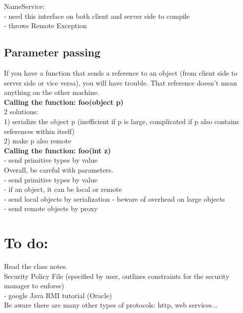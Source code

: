 \documentclass[twoside]{article}
\begin{document}
NameService: \\
 - need this interface on both client and server side to compile \\
 - throws Remote Exception \\
 
\subsection{Parameter passing} 

If you have a function that sends a reference to an object (from client side to server side or vice versa), you will have trouble.  That reference doesn't mean anything on the other machine. \\

\textbf{Calling the function:  foo(object p)} \\
2 solutions: \\
 1) serialize the object p (inefficient if p is large, complicated if p also contains references within itself) \\
 2) make p also remote \\
 
\textbf{Calling the function:  foo(int z)} \\
 - send primitive types by value \\
 
Overall, be careful with parameters. \\
 - send primitive types by value \\
 - if an object, it can be local or remote \\
 - send local objects by serialization - beware of overhead on large objects \\
 - send remote objects by proxy \\

\section{To do:}

Read the class notes. \\

Security Policy File (specified by user, outlines constraints for the security manager to enforse) \\
 - google Java RMI tutorial (Oracle) \\
 
Be aware there are many other types of protocols: http, web services... \\
\end{document}
